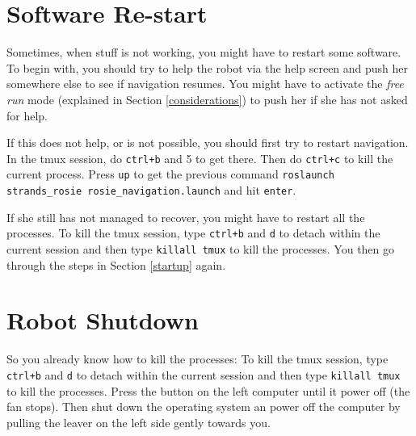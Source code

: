 \documentclass[a4paper,11pt]{article}
\begin{document}
\section{Software Re-start}

Sometimes, when stuff is not working, you might have to restart some software. To begin with, you should try to help the robot via the help screen and push her somewhere else to see if navigation resumes. You might have to activate the \textit{free run} mode (explained in Section \ref{considerations}) to push her if she has not asked for help.

If this does not help, or is not possible, you should first try to restart navigation. In the tmux session, do \texttt{ctrl+b} and 5 to get there. Then do \texttt{ctrl+c} to kill the current process. Press \texttt{up} to get the previous command \texttt{roslaunch strands\_rosie rosie\_navigation.launch} and hit \texttt{enter}.

If she still has not managed to recover, you might have to restart all the processes. To kill the tmux session, type \texttt{ctrl+b} and \texttt{d} to detach within the current session and then type \texttt{killall tmux} to kill the processes. You then go through the steps in Section \ref{startup} again.

\section{Robot Shutdown}
\label{shutdown}

So you already know how to kill the processes: To kill the tmux session, type \texttt{ctrl+b} and \texttt{d} to detach within the current session and then type \texttt{killall tmux} to kill the processes.
Press the button on the left computer until it power off (the fan stops).
Then shut down the operating system an power off the computer by pulling
the leaver on the left side gently towards you.
\end{document}

